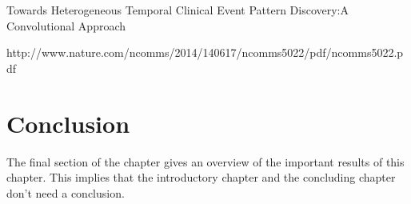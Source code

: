 Towards Heterogeneous Temporal Clinical Event Pattern
Discovery:A Convolutional Approach


http://www.nature.com/ncomms/2014/140617/ncomms5022/pdf/ncomms5022.pdf


\section{Conclusion}
The final section of the chapter gives an overview of the important results
of this chapter. This implies that the introductory chapter and the
concluding chapter don't need a conclusion.



